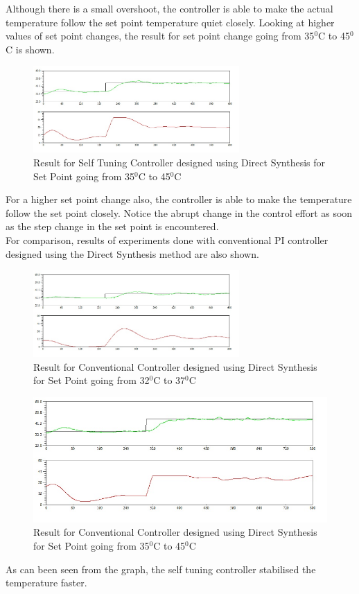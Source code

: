 Although there is a small overshoot, the controller is able to make the actual temperature follow the set point temperature quiet closely. Looking at higher values of set point changes, the result for set point change going from 35$^0$C to 45$^0$C is shown.
\begin{figure}[h]
	\centering
\includegraphics[width=0.7\textwidth]{Vikas_self/report_tex/PID_results/self_tuning/NewSetpoint_change/DirectSynthesis/step35to45.jpg}
	\caption{Result for Self Tuning Controller designed using Direct Synthesis for Set Point going from 35$^0$C to 45$^0$C }
	\label{fig:step35to45}
\end{figure}

For a higher set point change also, the controller is able to make the temperature follow the set point closely. Notice the abrupt change in the control effort as soon as the step change in the set point is encountered.\\For comparison, results of experiments done with conventional PI controller designed using the Direct Synthesis method are also shown.

\begin{figure}[h]
	\centering
\includegraphics[width=0.7\textwidth]{Vikas_self/report_tex/PID_results/Conventional_Tuning/Setpointchange/Direct_Synthesis/step32to37.jpg}
	\caption{Result for Conventional Controller designed using Direct Synthesis for Set Point going from 32$^0$C to 37$^0$C }
\end{figure}

\begin{figure}[h]
	\centering
\includegraphics[width=.7\textwidth]{Vikas_self/report_tex/PID_results/Conventional_Tuning/Setpointchange/Direct_Synthesis/step35to45.jpg}
	\caption{Result for Conventional Controller designed using Direct Synthesis for Set Point going from 35$^0$C to 45$^0$C }
\end{figure}
As can been seen from the graph, the self tuning controller stabilised the temperature faster.
\newpage


